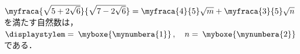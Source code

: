 \documentclass[../../../../uem_mei_q.tex]{subfiles}
\begin{document}
    $\myfraca{\sqrt{5+2\sqrt{6}}}{\sqrt{7-2\sqrt{6}}}=%
    \myfraca{4}{5}\sqrt{m}+\myfraca{3}{5}\sqrt{n}$ を満たす自然数は，\\
    \hspace{3\zw}%
    $\displaystyle%
        m=\:\myboxe{\mynumbera{1}}\,,\quad n=\:\myboxe{\mynumbera{2}}\,%
    $\\
    である．
\end{document}
